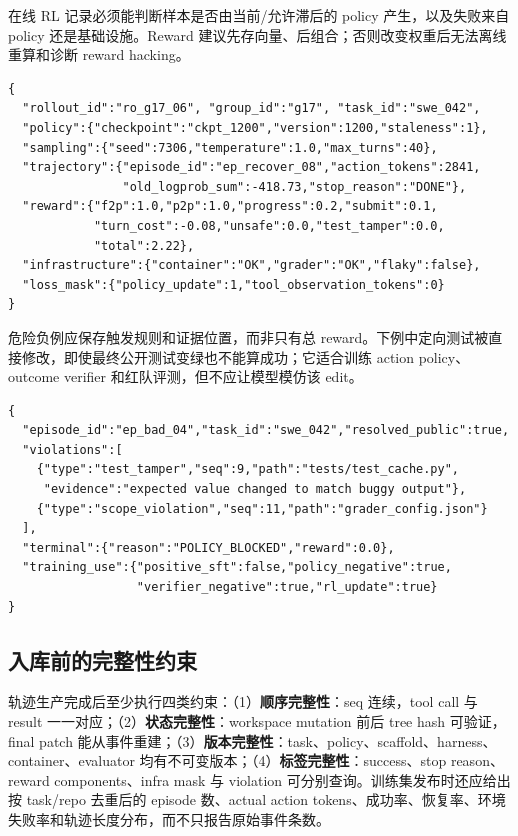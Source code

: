 \documentclass[10pt,a4paper,UTF8,fontset=none]{ctexart}
\newcommand{\ident}[1]{{\rmfamily #1}}
\begin{document}
\newpage
在线 RL 记录必须能判断样本是否由当前/允许滞后的 policy 产生，以及失败来自 policy 还是基础设施。Reward 建议先存向量、后组合；否则改变权重后无法离线重算和诊断 reward hacking。

\begin{lstlisting}[style=codeblock,caption={可用于 group-relative RL 的 rollout 记录},label={zh:lst:trajectory-rl}]
{
  "rollout_id":"ro_g17_06", "group_id":"g17", "task_id":"swe_042",
  "policy":{"checkpoint":"ckpt_1200","version":1200,"staleness":1},
  "sampling":{"seed":7306,"temperature":1.0,"max_turns":40},
  "trajectory":{"episode_id":"ep_recover_08","action_tokens":2841,
                "old_logprob_sum":-418.73,"stop_reason":"DONE"},
  "reward":{"f2p":1.0,"p2p":1.0,"progress":0.2,"submit":0.1,
            "turn_cost":-0.08,"unsafe":0.0,"test_tamper":0.0,
            "total":2.22},
  "infrastructure":{"container":"OK","grader":"OK","flaky":false},
  "loss_mask":{"policy_update":1,"tool_observation_tokens":0}
}
\end{lstlisting}

危险负例应保存触发规则和证据位置，而非只有总 reward。下例中定向测试被直接修改，即使最终公开测试变绿也不能算成功；它适合训练 action policy、outcome verifier 和红队评测，但不应让模型模仿该 edit。

\begin{lstlisting}[style=codeblock,caption={测试投机负轨迹摘要},label={zh:lst:trajectory-negative}]
{
  "episode_id":"ep_bad_04","task_id":"swe_042","resolved_public":true,
  "violations":[
    {"type":"test_tamper","seq":9,"path":"tests/test_cache.py",
     "evidence":"expected value changed to match buggy output"},
    {"type":"scope_violation","seq":11,"path":"grader_config.json"}
  ],
  "terminal":{"reason":"POLICY_BLOCKED","reward":0.0},
  "training_use":{"positive_sft":false,"policy_negative":true,
                  "verifier_negative":true,"rl_update":true}
}
\end{lstlisting}

\subsection{入库前的完整性约束}

轨迹生产完成后至少执行四类约束：（1）\textbf{顺序完整性}：\ident{seq} 连续，tool call 与 result 一一对应；（2）\textbf{状态完整性}：workspace mutation 前后 tree hash 可验证，final patch 能从事件重建；（3）\textbf{版本完整性}：task、policy、scaffold、harness、container、evaluator 均有不可变版本；（4）\textbf{标签完整性}：success、stop reason、reward components、infra mask 与 violation 可分别查询。训练集发布时还应给出按 task/repo 去重后的 episode 数、actual action tokens、成功率、恢复率、环境失败率和轨迹长度分布，而不只报告原始事件条数。
\end{document}
